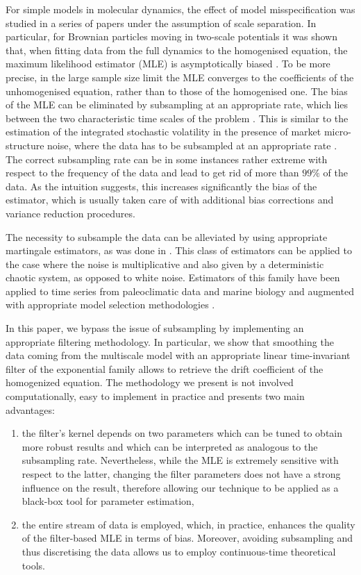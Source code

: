 \documentclass[10pt]{article}
\begin{document}
For simple models in molecular dynamics, the effect of model misspecification was studied in a series of papers \cite{PaS07,PPS09,PPS12,GaS17,GaS18} under the assumption of scale separation. In particular, for Brownian particles moving in two-scale potentials it was shown that, when fitting data from the full dynamics to the homogenised equation, the maximum likelihood estimator (MLE) is asymptotically biased \cite[Theorem 3.4]{PaS07}. To be more precise, in the large sample size limit the MLE converges to the coefficients of the unhomogenised equation, rather than to those of the homogenised one. The bias of the MLE can be eliminated by subsampling at an appropriate rate, which lies between the two characteristic time scales of the problem \cite[Theorems 3.5 and 3.6]{PaS07}. This is similar to the estimation of the integrated stochastic volatility in the presence of market micro-structure noise, where the data has to be subsampled at an appropriate rate \cite{AMZ05,ZMA05}. The correct subsampling rate can be in some instances rather extreme with respect to the frequency of the data and lead to get rid of more than $99\%$ of the data. As the intuition suggests, this increases significantly the bias of the estimator, which is usually taken care of with additional bias corrections and variance reduction procedures.

The necessity to subsample the data can be alleviated by using appropriate martingale estimators, as was done in \cite{KPK13,KKP15}. This class of estimators can be applied to the case where the noise is multiplicative and also given by a deterministic chaotic system, as opposed to white noise. Estimators of this family have been applied to time series from paleoclimatic data and marine biology and augmented with appropriate model selection methodologies \cite{KPP15}.

In this paper, we bypass the issue of subsampling by implementing an appropriate filtering methodology. In particular, we show that smoothing the data coming from the multiscale model with an appropriate linear time-invariant filter of the exponential family allows to retrieve the drift coefficient of the homogenized equation. The methodology we present is not involved computationally, easy to implement in practice and presents two main advantages:
\begin{enumerate}
	\item the filter's kernel depends on two parameters which can be tuned to obtain more robust results and which can be interpreted as analogous to the subsampling rate. Nevertheless, while the MLE is extremely sensitive with respect to the latter, changing the filter parameters does not have a strong influence on the result, therefore allowing our technique to be applied as a black-box tool for parameter estimation,
	\item the entire stream of data is employed, which, in practice, enhances the quality of the filter-based MLE in terms of bias. Moreover, avoiding subsampling and thus discretising the data allows us to employ continuous-time theoretical tools.
\end{enumerate}
\end{document}

